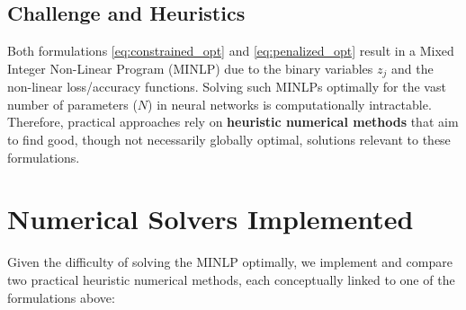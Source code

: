\documentclass[conference]{IEEEtran} %
\begin{document}
\subsection{Challenge and Heuristics}
Both formulations \eqref{eq:constrained_opt} and \eqref{eq:penalized_opt} result in a Mixed Integer Non-Linear Program (MINLP) due to the binary variables $z_j$ and the non-linear loss/accuracy functions. Solving such MINLPs optimally for the vast number of parameters ($N$) in neural networks is computationally intractable. Therefore, practical approaches rely on \textbf{heuristic numerical methods} that aim to find good, though not necessarily globally optimal, solutions relevant to these formulations.

\section{Numerical Solvers Implemented}
Given the difficulty of solving the MINLP optimally, we implement and compare two practical heuristic numerical methods, each conceptually linked to one of the formulations above:
\end{document}
